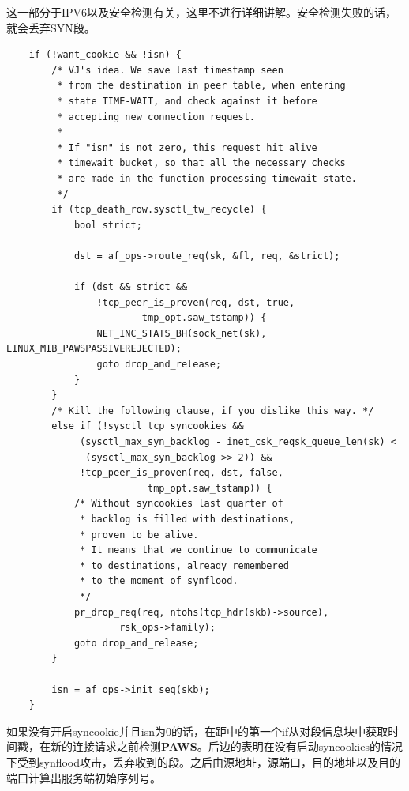 \documentclass[11pt, a4paper,oneside]{book}
\theoremstyle{ocrenumbox}
\theoremstyle{purplenumbox}
\theoremstyle{blackbox}
\begin{document}
		这一部分于IPV6以及安全检测有关，这里不进行详细讲解。安全检测失败的话，就会丢弃SYN段。

\begin{verbatim}
	if (!want_cookie && !isn) {
		/* VJ's idea. We save last timestamp seen
		 * from the destination in peer table, when entering
		 * state TIME-WAIT, and check against it before
		 * accepting new connection request.
		 *
		 * If "isn" is not zero, this request hit alive
		 * timewait bucket, so that all the necessary checks
		 * are made in the function processing timewait state.
		 */
		if (tcp_death_row.sysctl_tw_recycle) {
			bool strict;

			dst = af_ops->route_req(sk, &fl, req, &strict);

			if (dst && strict &&
			    !tcp_peer_is_proven(req, dst, true,
						tmp_opt.saw_tstamp)) {
				NET_INC_STATS_BH(sock_net(sk), LINUX_MIB_PAWSPASSIVEREJECTED);
				goto drop_and_release;
			}
		}
		/* Kill the following clause, if you dislike this way. */
		else if (!sysctl_tcp_syncookies &&
			 (sysctl_max_syn_backlog - inet_csk_reqsk_queue_len(sk) <
			  (sysctl_max_syn_backlog >> 2)) &&
			 !tcp_peer_is_proven(req, dst, false,
					     tmp_opt.saw_tstamp)) {
			/* Without syncookies last quarter of
			 * backlog is filled with destinations,
			 * proven to be alive.
			 * It means that we continue to communicate
			 * to destinations, already remembered
			 * to the moment of synflood.
			 */
			pr_drop_req(req, ntohs(tcp_hdr(skb)->source),
				    rsk_ops->family);
			goto drop_and_release;
		}

		isn = af_ops->init_seq(skb);
	}
\end{verbatim}

		如果没有开启syncookie并且isn为0的话，在距中的第一个if从对段信息块中获取时间戳，在新的连接请求之前检测\textbf{PAWS}。后边的表明在没有启动syncookies的情况下受到synflood攻击，丢弃收到的段。之后由源地址，源端口，目的地址以及目的端口计算出服务端初始序列号。
\end{document}
